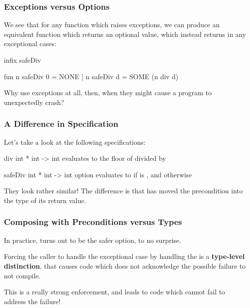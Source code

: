 \documentclass[aspectratio=169, handout]{beamer}
\begin{document}
\begin{frame}[fragile]
  \frametitle{Exceptions versus Options}

  We see that for any function which raises exceptions, we can produce
  an equivalent function which returns an optional value, which instead
  returns  in any exceptional cases:

  \pause
  \begin{codeblock}
    infix safeDiv

    fun n safeDiv 0 = NONE
      | n safeDiv d = SOME (n div d)
  \end{codeblock}

  \pause
  \vspace{\fill}

  Why use exceptions at all, then, when they might cause a program to
  unexpectedly crash?
\end{frame}

\begin{frame}[fragile]
  \frametitle{A Difference in Specification}

  Let's take a look at the following specifications:

  \pause
  \spec
    {div}
    {int * int -> int}
    {}
    { evaluates to the
    floor of  divided by }

  \pause
  \spec
    {safeDiv}
    {int * int -> int option}
    {}
    { evaluates to  if  is ,
    and  otherwise}

  \pause
  They look rather similar! The difference is that  has
  moved the precondition into the type of its return value.
\end{frame}

\begin{frame}[fragile]
  \frametitle{Composing with Preconditions versus Types}

  \tgs

  In practice,  turns out to be the safer option,
  to no surprise.

  \pause
  \vspace{\fill}

  Forcing the caller to handle the exceptional case by handling the
   is a \textbf{type-level distinction}, that causes code which
  does not acknowledge the possible failure to not compile.

  \pause
  \vspace{\fill}

  This is a really strong enforcement, and leads to code which cannot
  fail to address the failure!
\end{frame}
\end{document}
